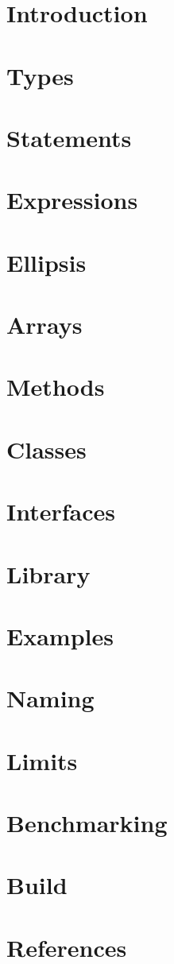 \documentclass{book}
\def\code#1{}
\def\Chapter#1{\chapter{#1}}
\begin{document}




\frontmatter
\tableofcontents

\mainmatter

\chapter*{Introduction}


\Chapter{Types}

\Chapter{Statements}

\Chapter{Expressions}

\Chapter{Ellipsis}

\Chapter{Arrays}

\Chapter{Methods}

\Chapter{Classes}

\Chapter{Interfaces}

\Chapter{Library}

\appendix

\def\code#1{\VerbatimInput[obeytabs, tabsize=4]{#1}}

\Chapter{Examples}

\Chapter{Naming}

\Chapter{Limits}

\Chapter{Benchmarking}

\def\code#1{}

\Chapter{Build}

\Chapter{References}

\backmatter
\printindex


\end{document}
